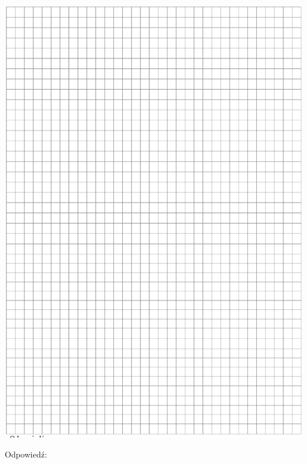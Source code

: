 \documentclass[10pt]{article}
\begin{document}
\includegraphics[max width=\textwidth, center]{2024_11_21_997c30e0b98e62837d84g-17}

Odpowiedź:
\end{document}
